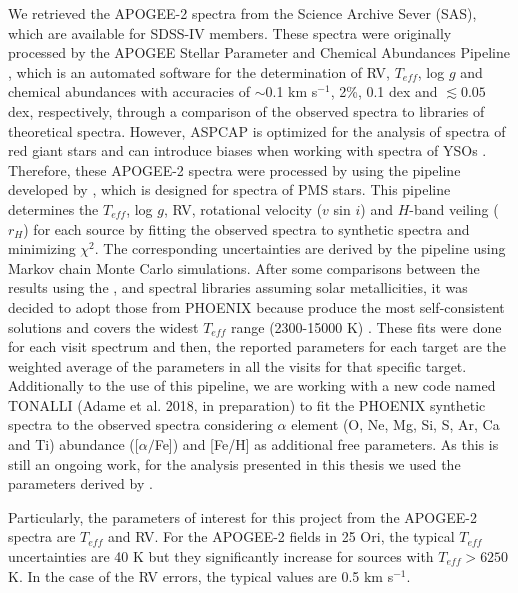 \documentclass[12pt]{article}
\newcounter{subsubsubsection}[subsubsection]
\begin{document}
\label{sec_APOGEE-2:targets}
We retrieved the APOGEE-2 spectra from the Science Archive Sever (\ac{SAS}), which are available for SDSS-IV members. These spectra were originally processed by the APOGEE Stellar Parameter and Chemical Abundances Pipeline \citep[\ac{ASPCAP}; ][]{GarciaPerez2016}, which is an automated software for the determination of RV, $T_{eff}$, log $g$ and chemical abundances with accuracies of $\sim$0.1 km s$^{-1}$, 2\%, 0.1 dex and $\lesssim0.05$ dex, respectively, through a comparison of the observed spectra to libraries of theoretical spectra. However, ASPCAP is optimized for the analysis of spectra of red giant stars and can introduce biases when working with spectra of YSOs \citep{Nidever2015}. Therefore, these APOGEE-2 spectra were processed by \citet{Kounkel2018} using the pipeline developed by \citet{Cottaar2014}, which is designed for spectra of PMS stars. This pipeline determines the $T_{eff}$, log $g$, RV, rotational velocity ($v$ sin $i$) and $H$-band veiling ($r_H$) for each source by fitting the observed spectra to synthetic spectra and minimizing $\chi^2$. The corresponding uncertainties are derived by the pipeline using Markov chain Monte Carlo simulations. After some comparisons between the results using the \citet{Coelho2005}, \citet{Allard2012} and \citet[\ac{PHOENIX}; ][]{Husser2013} spectral libraries assuming solar metallicities, it was decided to adopt those from PHOENIX because produce the most self-consistent solutions and covers the widest $T_{eff}$ range (2300-15000 K) \citep{Kounkel2018}. These fits were done for each visit spectrum and then, the reported parameters for each target are the weighted average of the parameters in all the visits for that specific target. Additionally to the use of this pipeline, we are working with a new code named TONALLI (Adame et al. 2018, in preparation) to fit the PHOENIX synthetic spectra to the observed spectra considering $\alpha$ element (O, Ne, Mg, Si, S, Ar, Ca and Ti) abundance ([$\alpha/$Fe]) and [Fe/H] as additional free parameters. As this is still an ongoing work, for the analysis presented in this thesis we used the parameters derived by \citet{Kounkel2018}. 

Particularly, the parameters of interest for this project from the APOGEE-2 spectra are $T_{eff}$ and RV. For the APOGEE-2 fields in 25 Ori, the typical $T_{eff}$ uncertainties are 40 K but they significantly increase for sources with $T_{eff}>6250$ K. In the case of the RV errors, the typical values are 0.5 km s$^{-1}$.
\end{document}
